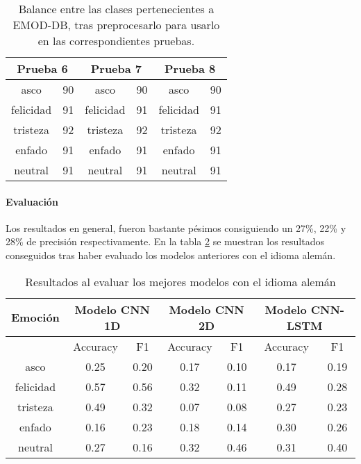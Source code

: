 \documentclass[11pt,a4paper,spanish]{book}
\begin{document}
	\begin{table}[H]
		\centering
		\begin{center}
			\begin{tabular}{ c  c | c  c |c  c }
				\multicolumn{2}{c|}{Prueba 6} &
				\multicolumn{2}{|c|}{Prueba 7} &
				\multicolumn{2}{|c}{Prueba 8} \\
				\hline
				asco 		& 90 & asco 	& 90 & asco 	  & 90\\
				felicidad 	& 91 & felicidad & 91 & felicidad & 91\\
				tristeza 	& 92 & tristeza & 92 & tristeza   & 92\\
				enfado 		& 91 & enfado 	& 91 & enfado 	  & 91\\
				neutral 	& 91 & neutral 	& 91 & neutral 	  & 91\\
				\hline
			\end{tabular}
			
			\caption{Balance entre las clases pertenecientes a EMOD-DB, tras preprocesarlo para usarlo en las correspondientes pruebas.}
			\label{ref:balanceTest678}
		\end{center}
	\end{table}
	
	\paragraph{Evaluación}
	Los resultados en general, fueron bastante pésimos consiguiendo un 27\%, 22\% y 28\% de precisión respectivamente.
	En la tabla \ref{results_TestGerman} se muestran los resultados conseguidos tras haber evaluado los modelos anteriores con el idioma alemán.
	\begin{table}[H]
		\centering
		\begin{center}
			\begin{tabular}{| c|| c c |  c c |  c c | }
				\hline
				\multicolumn{1}{|c||}{Emoción} & 
				\multicolumn{2}{|c|}{Modelo CNN 1D}&
				\multicolumn{2}{|c|}{Modelo CNN 2D} &
				\multicolumn{2}{|c|}{Modelo CNN-LSTM} \\
				
				\hline
				& 
				\multicolumn{1}{|c|}{Accuracy}&\multicolumn{1}{|c|}{F1}&
				\multicolumn{1}{|c|}{Accuracy}&\multicolumn{1}{|c|}{F1}&
				\multicolumn{1}{|c|}{Accuracy}&\multicolumn{1}{|c|}{F1}\\
				\hline
				
				asco 		& 0.25 & 0.20 & 0.17 & 0.10 & 0.17 & 0.19 \\
				felicidad 	& 0.57 & 0.56 & 0.32 & 0.11 & 0.49 & 0.28 \\
				tristeza 	& 0.49 & 0.32 & 0.07 & 0.08 & 0.27 & 0.23 \\
				enfado 		& 0.16 & 0.23 & 0.18 & 0.14 & 0.30 & 0.26\\
				neutral 	& 0.27 & 0.16 & 0.32 & 0.46 & 0.31 & 0.40\\
				\hline
			\end{tabular}
			
			\caption{Resultados al evaluar los mejores modelos con el idioma alemán}
			\label{results_TestGerman}
		\end{center}
	\end{table}
\end{document}
